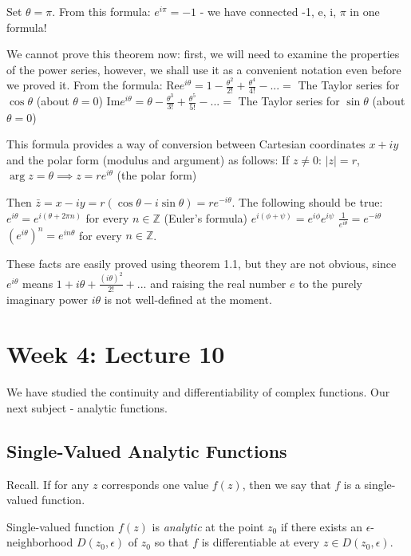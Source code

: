 \documentclass[12pt]{article}
\newcommand{\Rea}{\text{Re}}
\newcommand{\Ima}{\text{Im}}
\begin{document}
Set $\theta = \pi$. From this formula: $e^{i\pi} = -1$ - we have connected -1, e, i, $\pi$ in one formula!

We cannot prove this theorem now: first, we will need to examine the properties of the power series, however, we shall use it as a convenient notation even before we proved it. From the formula:
$\Rea e^{i\theta} = 1 - \frac{\theta^2}{2!} + \frac{\theta^4}{4!} - ... = $ The Taylor series for $\cos\theta$ (about $\theta = 0$)
$\Ima e^{i\theta} = \theta - \frac{\theta^3}{3!} + \frac{\theta^5}{5!} - ... = $ The Taylor series for $\sin\theta$ (about $\theta = 0$)

This formula provides a way of conversion between Cartesian coordinates $x+iy$ and the polar form (modulus and argument) as follows:
If $z\neq 0$: $|z|=r$, $\arg z = \theta \implies z = re^{i\theta}$ (the polar form)

Then $\bar{z} = x-iy = r(\cos\theta - i\sin\theta) = re^{-i\theta}$.
The following should be true:
$e^{i\theta} = e^{i(\theta + 2\pi n)}$ for every $n\in\mathbb{Z}$ (Euler's formula)
$e^{i(\phi + \psi)} = e^{i\phi}e^{i\psi}$
$\frac{1}{e^{i\theta}} = e^{-i\theta}$
$(e^{i\theta})^n = e^{in\theta}$ for every $n\in\mathbb{Z}$.

These facts are easily proved using theorem 1.1, but they are not obvious, since $e^{i\theta}$ means $1 + i\theta + \frac{(i\theta)^2}{2!} + ...$ and raising the real number $e$ to the purely imaginary power $i\theta$ is not well-defined at the moment.

\section{Week 4: Lecture 10}
We have studied the continuity and differentiability of complex functions. Our next subject - analytic functions.

\subsection{Single-Valued Analytic Functions}
Recall. If for any $z$ corresponds one value $f(z)$, then we say that $f$ is a single-valued function.

\begin{definition}
Single-valued function $f(z)$ is \emph{analytic} at the point $z_0$ if there exists an $\epsilon$-neighborhood $D(z_0, \epsilon)$ of $z_0$ so that $f$ is differentiable at every $z \in D(z_0, \epsilon)$.
\end{definition}
\end{document}
